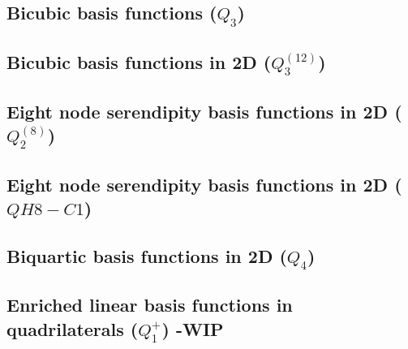 \subsection{Bicubic basis functions ($Q_3$) \label{ss:q32d}}



\subsection{Bicubic basis functions in 2D ($Q_3^{(12)}$) \label{ss:q3122d}}





\subsection{Eight node serendipity basis functions in 2D ($Q_2^{(8)}$)}
\label{sec:serendipity2D}



\subsection{Eight node serendipity basis functions in 2D ($QH8-C1$)}
\label{sec:serendipity2Db}
 



\subsection{Biquartic basis functions in 2D ($Q_4$) \label{ss:q42d}}


\subsection{Enriched linear basis functions in quadrilaterals ($Q_1^+$) -WIP} \label{ss:quadmini}


